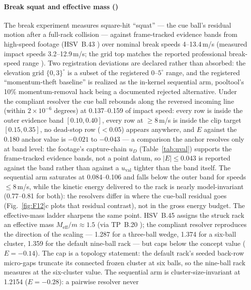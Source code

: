 \paragraph{Break squat and effective mass ()}
The break experiment measures square-hit ``squat'' --- the cue ball's
residual motion after a full-rack collision --- against frame-tracked
evidence bands from high-speed footage (HSV~B.43
\citep{alciatore_hsv_catalog}) over nominal break speeds 4--13.4\,m/s
(measured impact speeds 3.2--12.9\,m/s; the grid top matches the reported
professional break-speed range \citep{alciatore_faq}). Two registration
deviations are declared rather than absorbed: the elevation grid $\{0, 3\}^\circ$
is a subset of the registered $0$--$5^\circ$ range, and the registered
``momentum-theft baseline'' is realized as the in-kernel sequential arm,
pooltool's 10\% momentum-removal hack \citep{kiefl2024pooltool} being a
documented rejected alternative. Under the compliant resolver the cue
ball rebounds along the reversed incoming line (within
$2\times10^{-6}$ degrees) at 0.137--0.159 of impact speed: every row is
inside the outer evidence band $[0.10, 0.40]$, every row at
$\geq 8$\,m/s is inside the clip target $[0.15, 0.35]$, no dead-stop row
($<0.05$) appears anywhere, and $E$ against the 0.180 anchor value is
$-0.021$ to $-0.043$ --- a comparison the anchor resolves only at band
level: the footage's capture-chain $u_D$ (Table~\ref{tab:uval}) supports
the frame-tracked evidence bands, not a point datum, so $|E| \leq 0.043$
is reported against the band rather than against a $u_{\mathrm{val}}$
tighter than the band itself. The sequential arm saturates at 0.084--0.106 and
falls below the outer band for speeds $\leq 8$\,m/s, while the kinetic
energy delivered to the rack is nearly model-invariant (0.77--0.81 for
both): the resolvers differ in where the cue-ball residual goes
(Fig.~\ref{fig:F12}c plots that residual contrast), not in the gross
energy budget. The effective-mass ladder
sharpens the same point. HSV~B.45 assigns the struck rack an effective
mass $M_{\mathrm{eff}}/m \approx 1.5$ (via TP~B.20
\citep{alciatore_tp_catalog}); the compliant resolver reproduces the
direction of the scaling --- 1.287 for a three-ball wedge, 1.374 for a
six-ball cluster, 1.359 for the default nine-ball rack --- but caps below
the concept value ($E = -0.14$).
The cap is a topology statement: the default rack's seeded back-row
micro-gaps truncate its connected frozen cluster at six balls, so the
nine-ball rack measures at the six-cluster value. The sequential arm is
cluster-size-invariant at 1.2154 ($E = -0.28$): a pairwise resolver never
